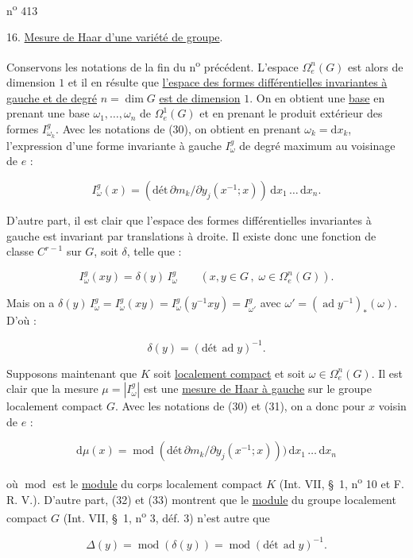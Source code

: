 \makeatletter
\tagsleft@true
\makeatother

 \hfill n\textsuperscript{o} 413

16. \uline{Mesure de Haar d'une variété de groupe}.

Conservons les notations de la fin du n\textsuperscript{o} précédent. L'espace $\Omega_e^n(G)$ est alors de dimension $1$ et il en résulte que \uline{l'espace des formes différentielles invariantes à gauche et de degré} $n=\dim G$ \uline{est de dimension} $1$. On en obtient une \uline{base} en prenant une base $\omega_1,\ldots,\omega_n$ de $\Omega_e^1(G)$ et en prenant le produit extérieur des formes $I^g_{\omega_k}$. Avec les notations de (30), on obtient en prenant $\omega_k=\mathrm{d}x_k$, l'expression d'une forme invariante à gauche $I^g_\omega$ de degré maximum au voisinage de $e$ :

\[
I^g_\omega(x)=(\text{dét}\,\partial m_k/\partial y_j(x^{-1};x))\,\mathrm{d}x_1\,\ldots\,\mathrm{d}x_n. \tag*{(31)}
\]

D'autre part, il est clair que l'espace des formes différentielles invariantes à gauche est invariant par translations à droite. Il existe donc une fonction de classe $C^{r-1}$ sur $G$, soit $\delta$, telle que :

\[
I^g_\omega(xy)=\delta(y)\,I^g_\omega\qquad (x,y\in G\,,\;\omega\in\Omega_e^n(G)). \tag*{(32)}
\]

Mais on a $\delta(y)\,I^g_\omega=I^g_\omega(xy)=I^g_\omega(y^{-1}xy)=I^g_{\omega'}$ avec $\omega'=(\operatorname{ad}y^{-1})_*(\omega)$. D'où :

\[
\delta(y)=(\text{dét}\,\operatorname{ad}y)^{-1}. \tag*{(33)}
\]

Supposons maintenant que $K$ soit \uline{localement compact} et soit $\omega\in\Omega_e^n(G)$. Il est clair que la mesure $\mu=|I^g_\omega|$ est une \uline{mesure de Haar à gauche} sur le groupe localement compact $G$. Avec les notations de (30) et (31), on a donc pour $x$ voisin de $e$ :

\[
\mathrm{d}\mu(x)=\operatorname{mod}(\text{dét}\,\partial m_k/\partial y_j(x^{-1};x)))\,\mathrm{d}x_1\,\ldots\,\mathrm{d}x_n \tag*{(34)}
\]

où $\operatorname{mod}$ est le \uline{module} du corps localement compact $K$ (Int. VII, \S\ 1, n\textsuperscript{o} 10 et F. R. V.). D'autre part, (32) et (33) montrent que le \uline{module} du groupe localement compact $G$ (Int. VII, \S\ 1, n\textsuperscript{o} 3, déf. 3) n'est autre que

\[
\Delta(y)=\operatorname{mod}(\delta(y))=\operatorname{mod}(\text{dét}\,\operatorname{ad}y)^{-1}. \tag*{(35)}
\]
